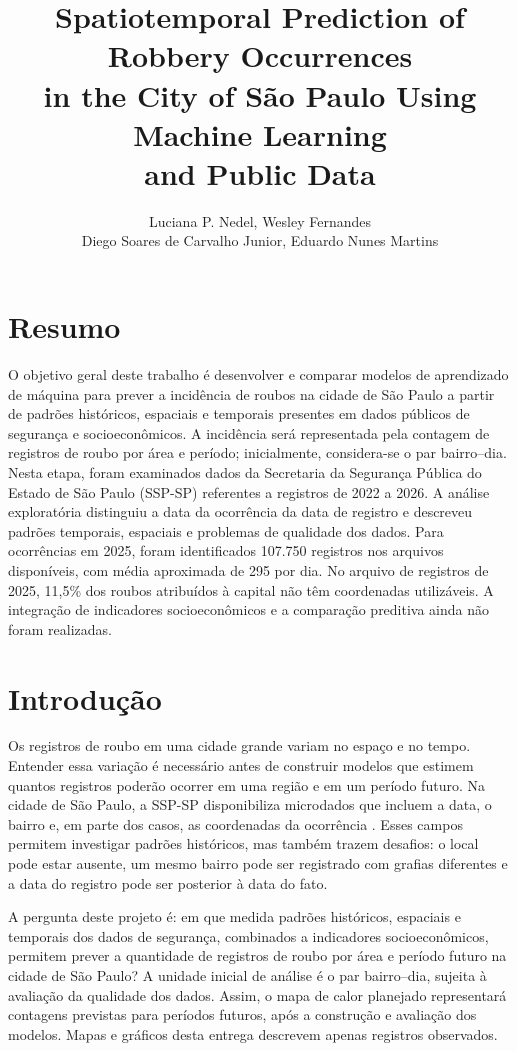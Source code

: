 \documentclass[12pt]{article}
\title{Spatiotemporal Prediction of Robbery Occurrences \\ in the City of São Paulo Using Machine Learning \\ and Public Data}
\author{Luciana P. Nedel\inst{1}, Wesley Fernandes\inst{2}\\ Diego Soares de Carvalho Junior\inst{1}, Eduardo Nunes Martins\inst{3}}
\begin{document}
\maketitle

\section{Resumo}

O objetivo geral deste trabalho é desenvolver e comparar modelos de aprendizado de máquina para prever a incidência de roubos na cidade de São Paulo a partir de padrões históricos, espaciais e temporais presentes em dados públicos de segurança e socioeconômicos. A incidência será representada pela contagem de registros de roubo por área e período; inicialmente, considera-se o par bairro--dia. Nesta etapa, foram examinados dados da Secretaria da Segurança Pública do Estado de São Paulo (SSP-SP) referentes a registros de 2022 a 2026. A análise exploratória distinguiu a data da ocorrência da data de registro e descreveu padrões temporais, espaciais e problemas de qualidade dos dados. Para ocorrências em 2025, foram identificados 107.750 registros nos arquivos disponíveis, com média aproximada de 295 por dia. No arquivo de registros de 2025, 11,5\% dos roubos atribuídos à capital não têm coordenadas utilizáveis. A integração de indicadores socioeconômicos e a comparação preditiva ainda não foram realizadas.

\section{Introdução}

Os registros de roubo em uma cidade grande variam no espaço e no tempo. Entender essa variação é necessário antes de construir modelos que estimem quantos registros poderão ocorrer em uma região e em um período futuro. Na cidade de São Paulo, a SSP-SP disponibiliza microdados que incluem a data, o bairro e, em parte dos casos, as coordenadas da ocorrência \cite{ssp}. Esses campos permitem investigar padrões históricos, mas também trazem desafios: o local pode estar ausente, um mesmo bairro pode ser registrado com grafias diferentes e a data do registro pode ser posterior à data do fato.

A pergunta deste projeto é: em que medida padrões históricos, espaciais e temporais dos dados de segurança, combinados a indicadores socioeconômicos, permitem prever a quantidade de registros de roubo por área e período futuro na cidade de São Paulo? A unidade inicial de análise é o par bairro--dia, sujeita à avaliação da qualidade dos dados. Assim, o mapa de calor planejado representará contagens previstas para períodos futuros, após a construção e avaliação dos modelos. Mapas e gráficos desta entrega descrevem apenas registros observados.
\end{document}
